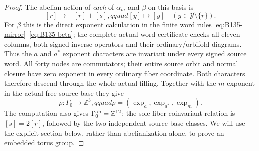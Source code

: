 \begin{proof}
The abelian action of \emph{each} of $\alpha_m$ and $\beta$
on this basis is
\begin{equation}\label{eq:B135-abelian-actions}
 [r]\longmapsto-[r]+[s],qquad
 [y]\longmapsto[y]\quad(y\in\mathcal Y\setminus\{r\}).
\end{equation}
For $\beta$ this is the direct exponent calculation in the
finite word rules \eqref{eq:B135-mirror}--\eqref{eq:B135-beta};
the complete actual-word certificate checks all eleven columns,
both signed inverse operators and their ordinary/orbifold
diagrams. Thus the $a$ and $a^*$ exponent characters are
invariant under every signed source word. All forty nodes
are commutators; their entire source orbit and normal closure
have zero exponent in every ordinary fiber coordinate.
Both characters therefore descend through the whole actual
filling. Together with the $m$-exponent in the actual free
source base they give
\begin{equation}\label{eq:B135-rho}
 \rho:\Gamma_0\longrightarrow\mathbb Z^3,qquad
 \rho=(\operatorname{exp}_a,\operatorname{exp}_{a^*},
                         \operatorname{exp}_m).
\end{equation}
The computation also gives $\Gamma_0^{\rm ab}=\mathbb Z^{12}$:
the sole fiber-coinvariant relation is $[s]=2[r]$, followed
by the two independent source-base classes. We will use the
explicit section below, rather than abelianization alone,
to prove an embedded torus group.


\end{proof}
